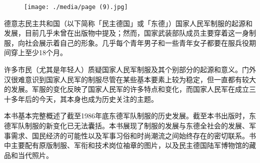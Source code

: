 \begin{figure}
\texttt{[image: ./media/page (9).jpg]}
\end{figure}

德意志民主共和国（以下简称「民主德国」或「东德」）国家人民军制服的起源和发展，目前几乎未曾在出版物中提及；然而，国家武装部队成员主要穿着这一身制服，向社会展示着自己的形象。几乎每个青年男子和一些青年女子都要在服兵役期间穿上至少18个月。

许多市民（尤其是年轻人）质疑国家人民军制服及其个别部分的起源和意义。门外汉很难意识到国家人民军的制服尽管在某些基本要素上较为稳定，但一直都有较大的发展。军服的变化反映了国家人民军的许多特点和变化，而国家人民军在成立三十多年后的今天，其本身也成为历史关注的主题。

本书基本完整概述了截至1986年底东德军队制服的历史发展。截至本书出版时，东德军队制服的新变化已无法囊括。本书展现了制服的发展与东德全社会的发展、军事需求、国民经济的可能性以及军事习俗和时尚潮流之间始终存在的密切联系。书中主要配有原版制服、军衔和技术岗位袖章的图片，以及民主德国陆军博物馆的藏品和当代照片。

